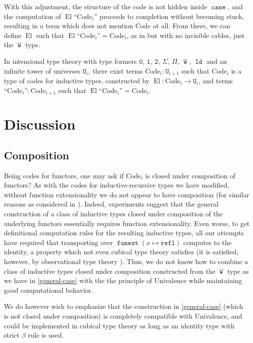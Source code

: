 \documentclass[a4paper,UKenglish,cleveref,nameinlink,autoref,thm-restate]{lipics-v2019}
\newcommand{\zero}{\mathtt{0}}
\newcommand{\one}{\mathtt{1}}
\newcommand{\bool}{\mathtt{2}}
\newcommand{\U}{\mathtt{U}}
\DeclareMathOperator{\case}{\mathtt{case}}
\DeclareMathOperator{\W}{\mathtt{W}}
\DeclareMathOperator{\Idop}{\mathtt{Id}}
\newcommand{\refl}{\mathtt{refl}}
\newcommand{\Code}{\mathrm{Code}}
\DeclareMathOperator{\El}{El}
\newcommand{\mathquote}[1]{\text{``${#1}$''}}
\DeclareMathOperator{\funext}{\mathtt{funext}}
\begin{document}
With this adjustment, the structure of the code is not hidden inside $\case$, and the computation of $\El\mathquote{\Code_i}$ proceeds to completion without becoming stuck, resulting in a term which does not mention $\Code$ at all. From there, we can define $\El$ such that $\El\mathquote{\Code_i} = \Code_i$, as in \cite{levitation} but with no invisible cables, just the $\W$ type.
\begin{theorem}
    In intensional type theory with type formers $\zero$, $\one$, $\bool$, $\Sigma$, $\Pi$, $\W$, $\Idop$ and an infinite tower of universes $\U_i$, there exist terms $\Code_i : \U_{i+1}$ such that $\Code_i$ is a type of codes for inductive types, constructed by $\El : \Code_i \to \U_i$, and terms $\mathquote{\Code_i} : \Code_{i+1}$ such that $\El\mathquote{\Code_i} = \Code_i$.
\end{theorem}

\section{Discussion}

\subsection{Composition}
Being codes for functors, one may ask if $\Code_i$ is closed under composition of functors? As with the codes for inductive-recursive types we have modified, without function extensionality we do not appear to have composition (for similar reasons as considered in \cite{variations-IR}). Indeed, experiments suggest that the general construction of a class of inductive types closed under composition of the underlying functors essentially requires function extensionality. Even worse, to get definitional computation rules for the resulting inductive types, all our attempts have required that transporting over $\funext(x\mapsto \refl)$ computes to the identity, a property which not even cubical type theory \cite{cchm-cubical} satisfies (it is satisfied, however, by observational type theory \cite{observational-type-theory}). Thus, we do not know how to combine a class of inductive types closed under composition constructed from the $\W$ type as we have in \cref{general-case} with the the principle of Univalence \cite{hott-book} while maintaining good computational behavior.

We do however wish to emphasize that the construction in \cref{general-case} (which is not closed under composition) is completely compatible with Univalence, and could be implemented in cubical type theory as long as an identity type with strict $\beta$ rule is used.
\end{document}
